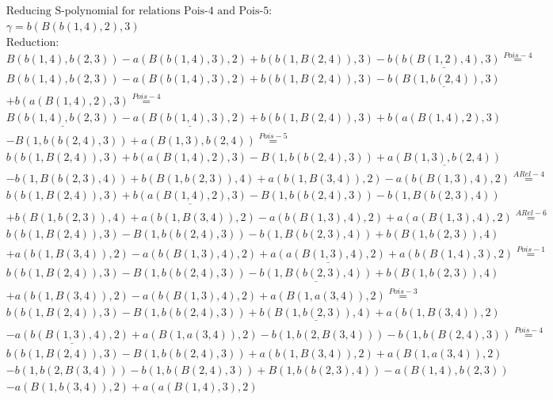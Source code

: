 \documentclass[11pt]{amsart}
\begin{document}
\begin{align*} 
& \text{Reducing S-polynomial for relations Pois-4 and Pois-5:} \\ 
& \gamma = b(B(b(1,4),2),3) \\ 
& \text{Reduction}: \\&B(b(1,4),b(2,3)) - a(B(b(1,4),3),2) + b(b(1,B(2,4)),3) - \underline{b(b(B(1,2),4),3)} \stackrel{ Pois-4 }{=}  \\ 
&B(b(1,4),b(2,3)) - a(B(b(1,4),3),2) + b(b(1,B(2,4)),3) - \underline{b(B(1,b(2,4)),3)}\\ 
 &  + b(a(B(1,4),2),3) \stackrel{ Pois-4 }{=}  \\ 
&\underline{B(b(1,4),b(2,3))} - \underline{a(B(b(1,4),3),2)} + b(b(1,B(2,4)),3) + b(a(B(1,4),2),3)\\ 
 &  - B(1,b(b(2,4),3)) + a(B(1,3),b(2,4)) \stackrel{ Pois-5 }{=}  \\ 
&b(b(1,B(2,4)),3) + b(a(B(1,4),2),3) - B(1,b(b(2,4),3)) + \underline{a(B(1,3),b(2,4))}\\ 
 &  - b(1,B(b(2,3),4)) + b(B(1,b(2,3)),4) + a(b(1,B(3,4)),2) - a(b(B(1,3),4),2) \stackrel{ ARel-4 }{=}  \\ 
&b(b(1,B(2,4)),3) + \underline{b(a(B(1,4),2),3)} - B(1,b(b(2,4),3)) - b(1,B(b(2,3),4))\\ 
 &  + b(B(1,b(2,3)),4) + a(b(1,B(3,4)),2) - a(b(B(1,3),4),2) + a(a(B(1,3),4),2) \stackrel{ ARel-6 }{=}  \\ 
&b(b(1,B(2,4)),3) - B(1,b(b(2,4),3)) - b(1,B(b(2,3),4)) + b(B(1,b(2,3)),4)\\ 
 &  + a(b(1,B(3,4)),2) - a(b(B(1,3),4),2) + \underline{a(a(B(1,3),4),2)} + a(b(B(1,4),3),2) \stackrel{ Pois-1 }{=}  \\ 
&b(b(1,B(2,4)),3) - B(1,b(b(2,4),3)) - \underline{b(1,B(b(2,3),4))} + b(B(1,b(2,3)),4)\\ 
 &  + a(b(1,B(3,4)),2) - a(b(B(1,3),4),2) + a(B(1,a(3,4)),2) \stackrel{ Pois-3 }{=}  \\ 
&b(b(1,B(2,4)),3) - B(1,b(b(2,4),3)) + \underline{b(B(1,b(2,3)),4)} + a(b(1,B(3,4)),2)\\ 
 &  - \underline{a(b(B(1,3),4),2)} + a(B(1,a(3,4)),2) - b(1,b(2,B(3,4))) - b(1,b(B(2,4),3)) \stackrel{ Pois-4 }{=}  \\ 
&b(b(1,B(2,4)),3) - B(1,b(b(2,4),3)) + a(b(1,B(3,4)),2) + a(B(1,a(3,4)),2)\\ 
 &  - b(1,b(2,B(3,4))) - b(1,b(B(2,4),3)) + B(1,b(b(2,3),4)) - a(B(1,4),b(2,3))\\ 
 &  - a(B(1,b(3,4)),2) + a(a(B(1,4),3),2)\\ 
\end{align*} 
 
\end{document}
